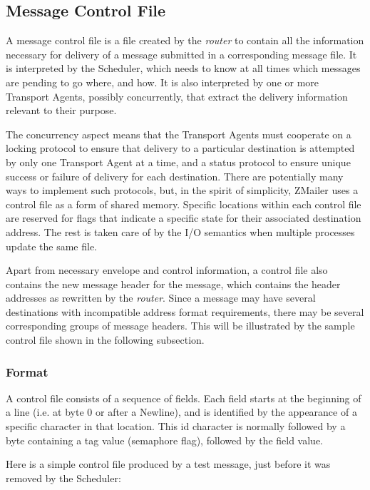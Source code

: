 \subsection{Message Control File}

A message control file is a file created by the {\em router\/} to contain all the
information necessary for delivery of a message submitted in a
corresponding message file.  It is interpreted by the Scheduler, which
needs to know at all times which messages are pending to go where, and how.
It is also interpreted by one or more Transport Agents, possibly
concurrently, that extract the delivery information relevant to their
purpose.

The concurrency aspect means that the Transport Agents must cooperate on a
locking protocol to ensure that delivery to a particular destination is
attempted by only one Transport Agent at a time, and a status protocol to
ensure unique success or failure of delivery for each destination.  There
are potentially many ways to implement such protocols, but, in the spirit
of simplicity, ZMailer uses a control file as a form of shared memory.
Specific locations within each control file are reserved for flags that
indicate a specific state for their associated destination address.  The
rest is taken care of by the I/O semantics when multiple processes update
the same file.

Apart from necessary envelope and control information, a control file also
contains the new message header for the message, which contains the header
addresses as rewritten by the {\em router\/}.  Since a message may have several
destinations with incompatible address format requirements, there may be
several corresponding groups of message headers.  This will be illustrated
by the sample control file shown in the following subsection.




\subsubsection{Format}

A control file consists of a sequence of fields.  Each field starts at the
beginning of a line (i.e. at byte 0 or after a Newline), and is identified
by the appearance of a specific character in that location.  This id
character is normally followed by a byte containing a tag value (semaphore
flag), followed by the field value.

Here is a simple control file produced by a test message, just before it
was removed by the Scheduler:

